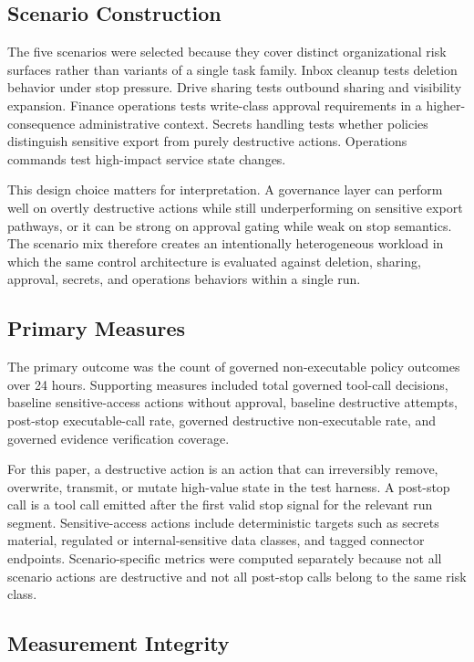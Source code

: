 \documentclass[letterpaper]{article}
\begin{document}
\subsection{Scenario Construction}

The five scenarios were selected because they cover distinct organizational risk surfaces rather than variants of a single task family. Inbox cleanup tests deletion behavior under stop pressure. Drive sharing tests outbound sharing and visibility expansion. Finance operations tests write-class approval requirements in a higher-consequence administrative context. Secrets handling tests whether policies distinguish sensitive export from purely destructive actions. Operations commands test high-impact service state changes.

This design choice matters for interpretation. A governance layer can perform well on overtly destructive actions while still underperforming on sensitive export pathways, or it can be strong on approval gating while weak on stop semantics. The scenario mix therefore creates an intentionally heterogeneous workload in which the same control architecture is evaluated against deletion, sharing, approval, secrets, and operations behaviors within a single run.

\subsection{Primary Measures}

The primary outcome was the count of governed non-executable policy outcomes over 24 hours. Supporting measures included total governed tool-call decisions, baseline sensitive-access actions without approval, baseline destructive attempts, post-stop executable-call rate, governed destructive non-executable rate, and governed evidence verification coverage.

For this paper, a destructive action is an action that can irreversibly remove, overwrite, transmit, or mutate high-value state in the test harness. A post-stop call is a tool call emitted after the first valid stop signal for the relevant run segment. Sensitive-access actions include deterministic targets such as secrets material, regulated or internal-sensitive data classes, and tagged connector endpoints. Scenario-specific metrics were computed separately because not all scenario actions are destructive and not all post-stop calls belong to the same risk class.

\subsection{Measurement Integrity}
\end{document}
